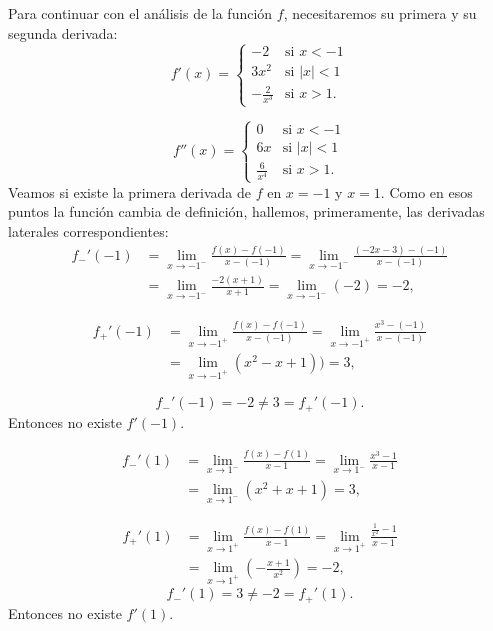 \begin{exemplo}[Solución]
Para continuar con el análisis de la función $f$, necesitaremos su primera y su segunda derivada:
\begin{equation*}
	f'(x)=
\begin{cases}
-2 & \text{si $x< -1$}\\
3x^2 & \text{si $|x|<1$}\\
-\frac{2}{x^3}& \text{si $x> 1$}.
\end{cases}
\end{equation*}

\begin{equation*}
	f''(x)=
\begin{cases}
0 & \text{si $x< -1$}\\
6x & \text{si $|x|<1$}\\
\frac{6}{x^4}& \text{si $x>1$}.
\end{cases}
\end{equation*}
Veamos si existe la primera derivada de $f$ en $x=-1$ y $x=1$. Como en esos puntos la función
cambia de definición, hallemos, primeramente, las derivadas laterales correspondientes:
\begin{align*}
f_-'(-1) & =\lim_{x\to -1^-}\frac{f(x)-f(-1)}{x-(-1)}= \lim_{x\to -1^-}\frac{(-2x -3) - (-1)} {x-(-1)}\\
&=\lim_{x\to -1^-}\frac{-2(x+1)}{x+1} =\lim_{x\to -1^-}(-2)=-2,
\end{align*}

\begin{align*}
f_+'(-1) & =\lim_{x\to -1^+}\frac{f(x)-f(-1)}{x-(-1)} =\lim_{x\to -1^+}\frac{x^3 -(- 1)}{x-(-1)} \\
& =\lim_{x\to -1^+}(x^2-x+1)) = 3,
\end{align*}

\begin{equation*}
f_-'(-1) = -2\neq 3=f_+'(-1).
\end{equation*}
Entonces no existe $f'(-1)$.

\begin{align*}
f_-'(1) & =\lim_{x\to 1^-}\frac{f(x)-f(1)}{x-1}= \lim_{x\to 1^-}\frac{x^3-1}{x-1}\\
& = \lim_{x\to 1^-}(x^2+x+1)= 3,
\end{align*}

\begin{align*}
f_+'(1) & =\lim_{x\to 1^+}\frac{f(x)-f(1)}{x-1} = \lim_{x\to 1^+}\frac{\frac{1}{x^2}-1}{x-1}\\
& = \lim_{x\to 1^+}\left(-\frac{x+1}{x^2}\right) = -2,
\end{align*}
\begin{equation*}
f_-'(1) = 3\neq -2=f_+'(1).
\end{equation*}
Entonces no existe $f'(1)$.


\end{exemplo}
